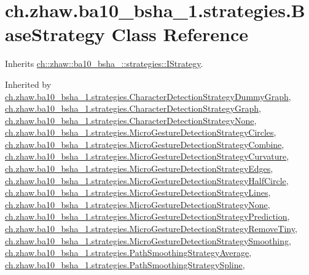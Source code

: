 \hypertarget{classch_1_1zhaw_1_1ba10__bsha__1_1_1strategies_1_1BaseStrategy}{
\section{ch.zhaw.ba10\_\-bsha\_\-1.strategies.BaseStrategy Class Reference}
\label{classch_1_1zhaw_1_1ba10__bsha__1_1_1strategies_1_1BaseStrategy}
}


Inherits \hyperlink{interfacech_1_1zhaw_1_1ba10__bsha__1_1_1strategies_1_1IStrategy}{ch::zhaw::ba10\_\-bsha\_::strategies::IStrategy}.

Inherited by \hyperlink{classch_1_1zhaw_1_1ba10__bsha__1_1_1strategies_1_1CharacterDetectionStrategyDummyGraph}{ch.zhaw.ba10\_\-bsha\_\-1.strategies.CharacterDetectionStrategyDummyGraph}, \hyperlink{classch_1_1zhaw_1_1ba10__bsha__1_1_1strategies_1_1CharacterDetectionStrategyGraph}{ch.zhaw.ba10\_\-bsha\_\-1.strategies.CharacterDetectionStrategyGraph}, \hyperlink{classch_1_1zhaw_1_1ba10__bsha__1_1_1strategies_1_1CharacterDetectionStrategyNone}{ch.zhaw.ba10\_\-bsha\_\-1.strategies.CharacterDetectionStrategyNone}, \hyperlink{classch_1_1zhaw_1_1ba10__bsha__1_1_1strategies_1_1MicroGestureDetectionStrategyCircles}{ch.zhaw.ba10\_\-bsha\_\-1.strategies.MicroGestureDetectionStrategyCircles}, \hyperlink{classch_1_1zhaw_1_1ba10__bsha__1_1_1strategies_1_1MicroGestureDetectionStrategyCombine}{ch.zhaw.ba10\_\-bsha\_\-1.strategies.MicroGestureDetectionStrategyCombine}, \hyperlink{classch_1_1zhaw_1_1ba10__bsha__1_1_1strategies_1_1MicroGestureDetectionStrategyCurvature}{ch.zhaw.ba10\_\-bsha\_\-1.strategies.MicroGestureDetectionStrategyCurvature}, \hyperlink{classch_1_1zhaw_1_1ba10__bsha__1_1_1strategies_1_1MicroGestureDetectionStrategyEdges}{ch.zhaw.ba10\_\-bsha\_\-1.strategies.MicroGestureDetectionStrategyEdges}, \hyperlink{classch_1_1zhaw_1_1ba10__bsha__1_1_1strategies_1_1MicroGestureDetectionStrategyHalfCircle}{ch.zhaw.ba10\_\-bsha\_\-1.strategies.MicroGestureDetectionStrategyHalfCircle}, \hyperlink{classch_1_1zhaw_1_1ba10__bsha__1_1_1strategies_1_1MicroGestureDetectionStrategyLines}{ch.zhaw.ba10\_\-bsha\_\-1.strategies.MicroGestureDetectionStrategyLines}, \hyperlink{classch_1_1zhaw_1_1ba10__bsha__1_1_1strategies_1_1MicroGestureDetectionStrategyNone}{ch.zhaw.ba10\_\-bsha\_\-1.strategies.MicroGestureDetectionStrategyNone}, \hyperlink{classch_1_1zhaw_1_1ba10__bsha__1_1_1strategies_1_1MicroGestureDetectionStrategyPrediction}{ch.zhaw.ba10\_\-bsha\_\-1.strategies.MicroGestureDetectionStrategyPrediction}, \hyperlink{classch_1_1zhaw_1_1ba10__bsha__1_1_1strategies_1_1MicroGestureDetectionStrategyRemoveTiny}{ch.zhaw.ba10\_\-bsha\_\-1.strategies.MicroGestureDetectionStrategyRemoveTiny}, \hyperlink{classch_1_1zhaw_1_1ba10__bsha__1_1_1strategies_1_1MicroGestureDetectionStrategySmoothing}{ch.zhaw.ba10\_\-bsha\_\-1.strategies.MicroGestureDetectionStrategySmoothing}, \hyperlink{classch_1_1zhaw_1_1ba10__bsha__1_1_1strategies_1_1PathSmoothingStrategyAverage}{ch.zhaw.ba10\_\-bsha\_\-1.strategies.PathSmoothingStrategyAverage}, \hyperlink{classch_1_1zhaw_1_1ba10__bsha__1_1_1strategies_1_1PathSmoothingStrategySpline}{ch.zhaw.ba10\_\-bsha\_\-1.strategies.PathSmoothingStrategySpline}, 